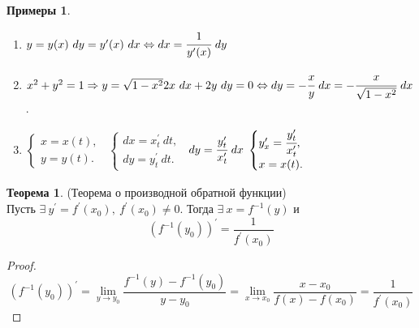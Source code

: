 \documentclass[a4paper, 12pt]{article}
\newcommand\tab[1][.5cm]{\hspace*{#1}}
\theoremstyle{definition}
\newtheorem*{theorem}{Теорема}
\newtheorem*{examples}{Примеры}
\begin{document}
        \begin{examples}\tab
            \begin{enumerate}
                \item $y=y(x)\ dy=y^{\prime}(x)\ dx \Leftrightarrow dx=\cfrac{1}{y^{\prime}(x)}\ dy$
                \item $x^2+y^2=1 \Rightarrow y=\sqrt{1-x^2}\\
                2x\ dx+2y\ dy=0 \Leftrightarrow dy=-\cfrac{x}{y}\ dx=-\cfrac{x}{\sqrt{1-x^2}}\ dx$.
                \item $\begin{cases}
                    x=x(t),\\
                    y=y(t).       
                \end{cases}$\
                $\begin{cases}
                    dx=x^{\prime}_t\ dt,\\
                    dy=y^{\prime}_t\ dt.       
                \end{cases}$\
                $dy=\cfrac{y^{\prime}_t}{x^{\prime}_t}\ dx$\tab
                $\begin{cases}
                    y^{\prime}_x=\cfrac{y^{\prime}_t}{x^{\prime}_t},\\
                    x=x(t).       
                \end{cases}$
            \end{enumerate}
        \end{examples}
        \begin{theorem} (Теорема о производной обратной функции)\\
            Пусть $\exists\ y^{\prime}=f^{\prime}(x_0),\ f^{\prime}(x_0)\ne 0$. Тогда $\exists\ x=f^{-1}(y)$ и 
            \[(f^{-1}(y_0))^{\prime}=\frac{1}{f^{\prime}(x_0)}\]
        \end{theorem} 
        \begin{proof}
            \[(f^{-1}(y_0))^{\prime}=\lim\limits_{y\to y_0}\frac{f^{-1}(y)-f^{-1}(y_0)}{y-y_0}=\lim\limits_{x\to x_0}\frac{x-x_0}{f(x)-f(x_0)}=\frac{1}{f^{\prime}(x_0)}\]
        \end{proof} 
\end{document}
